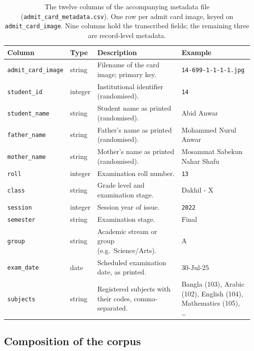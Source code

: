 \documentclass[a4paper,fleqn]{cas-dc}
\begin{document}
\begin{table}[width=\FullWidth,cols=4,pos=htbp]
\rmfamily
\caption{The twelve columns of the accompanying metadata file
(\texttt{admit\_card\_metadata.csv}). One row per admit card image, keyed on
\texttt{admit\_card\_image}. Nine columns hold the transcribed fields; the
remaining three are record-level metadata.}
\label{tab:schema}
\footnotesize
\begin{tabular}{@{}P{0.165\textwidth}P{0.075\textwidth}P{0.44\textwidth}P{0.235\textwidth}@{}}
\toprule
\textbf{Column} & \textbf{Type} & \textbf{Description} & \textbf{Example} \\
\midrule
\texttt{admit\_card\_image}
  & string & Filename of the card image; primary key.
  & \texttt{14-699-1-1-1-1.jpg} \\
\texttt{student\_id}
  & integer & Institutional identifier (randomised).
  & \texttt{14} \\
\texttt{student\_name}
  & string & Student name as printed (randomised).
  & Abid Anwar \\
\texttt{father\_name}
  & string & Father's name as printed (randomised).
  & Mohammed Nurul Anwar \\
\texttt{mother\_name}
  & string & Mother's name as printed (randomised).
  & Mosammat Sabekun Nahar Shafu \\
\texttt{roll}
  & integer & Examination roll number.
  & \texttt{13} \\
\texttt{class}
  & string & Grade level and examination stage.
  & Dakhil - X \\
\texttt{session}
  & integer & Session year of issue.
  & \texttt{2022} \\
\texttt{semester}
  & string & Examination stage.
  & Final \\
\texttt{group}
  & string & Academic stream or group (e.g.\ Science/Arts).
  & A \\
\texttt{exam\_date}
  & date & Scheduled examination date, as printed.
  & 30-Jul-25 \\
\texttt{subjects}
  & string & Registered subjects with their codes, comma-separated.
  & Bangla (103), Arabic (102), English (104), Mathematics (105), \ldots \\
\bottomrule
\end{tabular}
\end{table}

\subsection{Composition of the corpus}
\end{document}
